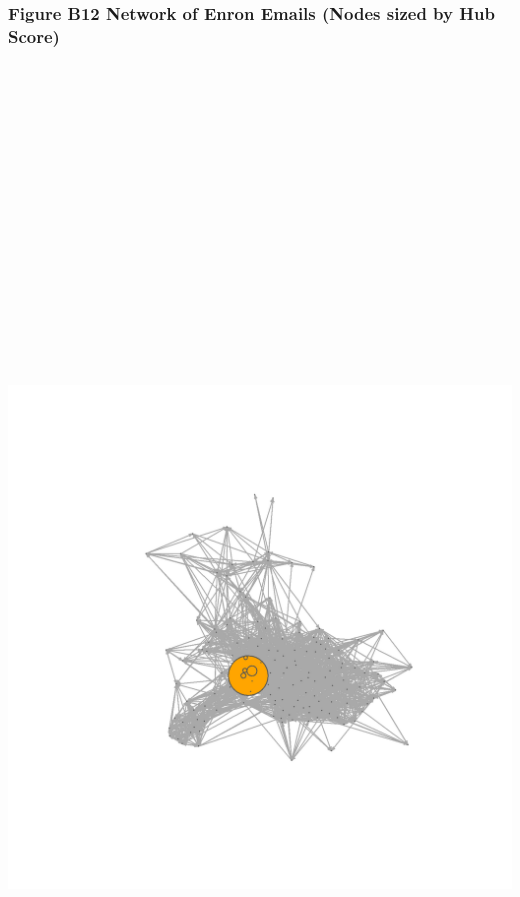 \documentclass[]{article}
\begin{document}
\newpage

\subsubsection{Figure B12 Network of Enron Emails (Nodes sized by Hub
Score)}\label{figure-b12-network-of-enron-emails-nodes-sized-by-hub-score}

\section{\texorpdfstring{\protect\includegraphics[height=12.50000in]{images/n_hs.png}}{Network of Enron Emails}}\label{network-of-enron-emails-9}
\end{document}
